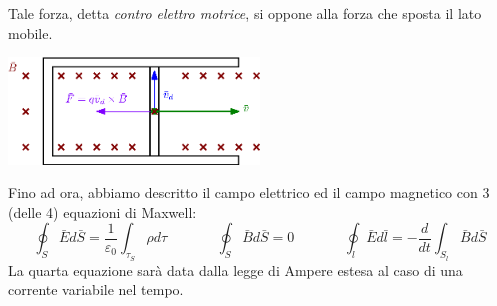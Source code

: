 \documentclass[10pt, letterpaper]{report}
\begin{document}
Tale forza, detta  \textit{contro elettro motrice}, si oppone alla forza che sposta il lato mobile.
\begin{center}
    \includegraphics[width=0.5\textwidth ]{images/sbarra3.eps}
\end{center}
Fino ad ora, abbiamo descritto il campo elettrico ed il campo magnetico con 3 (delle 4) equazioni di Maxwell:
$$ \oint_S \bar E d\bar S = \frac{1}{\varepsilon_0}\int_{\tau_S}\rho d\tau
\ \ \ \ \ \ \ \ \ \ \ \ \ \ \ \   \oint_S \bar B d\bar S =0 \ \ \ \ \ \ \ \  \ \ \ \ \ \ \ \  
 \oint_l \bar E d\bar l = -\frac{d}{dt}\int_{S_l}\bar B d\bar S$$
La quarta equazione sarà data dalla legge di Ampere estesa al caso di una corrente variabile nel tempo.
\end{document}
